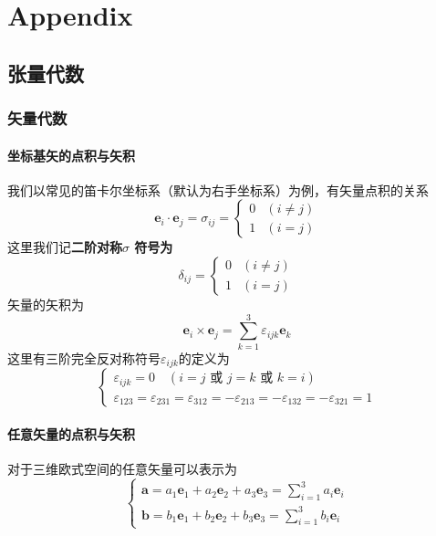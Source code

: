 \chapter{Appendix}
	\section{张量代数}
		\subsection{矢量代数}
			\subsubsection*{坐标基矢的点积与矢积\label{sec.app_1_1_1}}
				我们以常见的笛卡尔坐标系（默认为右手坐标系）为例，有矢量点积的关系
				\begin{equation}
					\boldsymbol{e}_{i} \cdot \boldsymbol{e}_{j}=\sigma_{ij}= \begin{cases}0 & (i \neq j) \\ 1 & (i=j)\end{cases}
				\end{equation}
				这里我们记\textbf{二阶对称$\sigma$ 符号为}
					\begin{equation}
						\delta_{i j}= \begin{cases}0 & (i \neq j) \\ 1 & (i=j)\end{cases}
					\end{equation}
				矢量的矢积为
					\begin{equation}
						\boldsymbol{e}_{i} \times \boldsymbol{e}_{j}=\sum_{k=1}^{3} \varepsilon_{i j k} \boldsymbol{e}_{k}
					\end{equation}
				这里有三阶完全反对称符号$\varepsilon_{ijk}$的定义为
				\begin{equation}
					\left\{\begin{array}{l}
					\varepsilon_{i j k}=0 \quad(i=j \text { 或 } j=k \text { 或 } k=i) \\
					\varepsilon_{123}=\varepsilon_{231}=\varepsilon_{312}=-\varepsilon_{213}=-\varepsilon_{132}=-\varepsilon_{321}=1
					\end{array}\right.
				\end{equation}
			\subsubsection*{任意矢量的点积与矢积}
				对于三维欧式空间的任意矢量可以表示为
					\begin{equation}
						\left\{\begin{array}{l}
						\boldsymbol{a}=a_{1} \boldsymbol{e}_{1}+a_{2} \boldsymbol{e}_{2}+a_{3} \boldsymbol{e}_{3}=\sum_{i=1}^{3} a_{i} \boldsymbol{e}_{i} \\
						\boldsymbol{b}=b_{1} \boldsymbol{e}_{1}+b_{2} \boldsymbol{e}_{2}+b_{3} \boldsymbol{e}_{3}=\sum_{i=1}^{3} b_{i} \boldsymbol{e}_{i}
						\end{array}\right.
					\end{equation}
				
